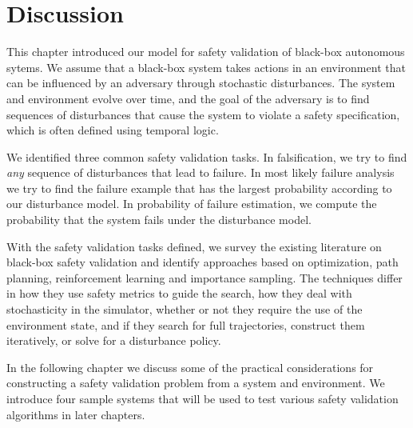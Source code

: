 \section{Discussion}
This chapter introduced our model for safety validation of black-box autonomous sytems. We assume that a black-box system takes actions in an environment that can be influenced by an adversary through stochastic disturbances. The system and environment evolve over time, and the goal of the adversary is to find sequences of disturbances that cause the system to violate a safety specification, which is often defined using temporal logic.

We identified three common safety validation tasks. In falsification, we try to find \emph{any} sequence of disturbances that lead to failure. In most likely failure analysis we try to find the failure example that has the largest probability according to our disturbance model. In probability of failure estimation, we compute the probability that the system fails under the disturbance model. 

With the safety validation tasks defined, we survey the existing literature on black-box safety validation and identify approaches based on optimization, path planning, reinforcement learning and importance sampling. The techniques differ in how they use safety metrics to guide the search, how they deal with stochasticity in the simulator, whether or not they require the use of the environment state, and if they search for full trajectories, construct them iteratively, or solve for a disturbance policy. 

In the following chapter we discuss some of the practical considerations for constructing a safety validation problem from a system and environment. We introduce four sample systems that will be used to test various safety validation algorithms in later chapters. 